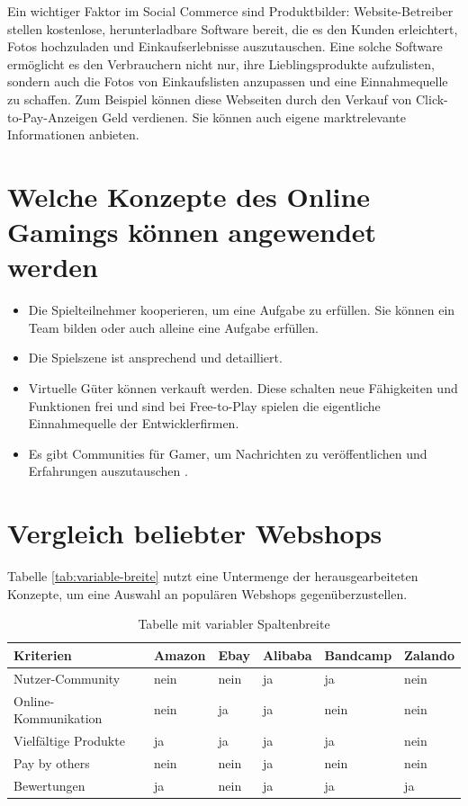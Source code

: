 \begin{itemize}
\end{itemize}

Ein wichtiger Faktor im Social Commerce sind Produktbilder: Website-Betreiber stellen kostenlose, herunterladbare Software bereit, die es den Kunden erleichtert, Fotos hochzuladen und Einkaufserlebnisse auszutauschen. Eine solche Software ermöglicht es den Verbrauchern nicht nur, ihre Lieblingsprodukte aufzulisten, sondern auch die Fotos von Einkaufslisten anzupassen und eine Einnahmequelle zu schaffen. Zum Beispiel können diese Webseiten durch den Verkauf von Click-to-Pay-Anzeigen Geld verdienen. Sie können auch eigene marktrelevante Informationen anbieten.


\section{Welche Konzepte des Online Gamings können angewendet werden}

\begin{itemize}
\item Die Spielteilnehmer kooperieren, um eine Aufgabe zu erfüllen. Sie können ein Team bilden oder auch alleine eine Aufgabe erfüllen.
\item Die Spielszene ist ansprechend und detailliert.
\item Virtuelle Güter können verkauft werden. Diese schalten neue Fähigkeiten und Funktionen frei und sind bei Free-to-Play spielen die eigentliche Einnahmequelle der Entwicklerfirmen.
\item Es gibt Communities für Gamer, um Nachrichten zu veröffentlichen und Erfahrungen auszutauschen \parencite[S. 126]{warmelink}.
\end{itemize}


\section{Vergleich beliebter Webshops}

Tabelle \vref{tab:variable-breite} nutzt eine Untermenge der herausgearbeiteten Konzepte, um eine Auswahl an populären Webshops gegenüberzustellen.

\begin{table}[htbp]
\centering
\begin{tabular}{l l l l l l}
\toprule
Kriterien				& Amazon	& Ebay	& Alibaba	& Bandcamp	& Zalando\\
\midrule
Nutzer-Community		& nein		& nein	& ja		& ja		& nein\\
Online-Kommunikation	& nein		& ja	& ja		& nein		& nein\\
Vielfältige Produkte	& ja		& ja	& ja		& ja		& nein\\
Pay by others			& nein		& nein	& ja		& nein		& nein\\
Bewertungen				& ja		& nein	& ja		& ja		& ja\\
\bottomrule
\end{tabular}
\caption{Tabelle mit variabler Spaltenbreite}
\label{tab:variable-breite}
\end{table}
